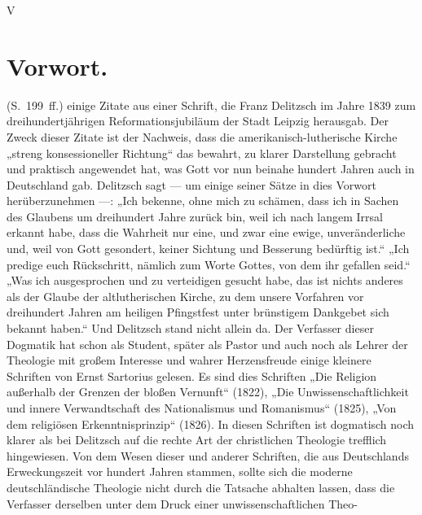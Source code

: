 \noindent\hfill V
\section*{Vorwort.}

(S.~199~ff.) einige Zitate aus einer Schrift, die Franz Delitzsch im Jahre 1839 zum dreihundertjährigen Reformationsjubiläum der Stadt Leipzig herausgab. Der Zweck dieser Zitate ist der Nachweis, dass die amerikanisch-lutherische Kirche „streng konsessioneller Richtung“ das bewahrt, zu klarer Darstellung gebracht und praktisch angewendet hat, was Gott vor nun beinahe hundert Jahren auch in Deutschland gab. Delitzsch sagt --- um einige seiner Sätze in dies Vorwort herüberzunehmen ---: „Ich bekenne, ohne mich zu schämen, dass ich in Sachen des Glaubens um dreihundert Jahre zurück bin, weil ich nach langem Irrsal erkannt habe, dass die Wahrheit nur eine, und zwar eine ewige, unveränderliche und, weil von Gott gesondert, keiner Sichtung und Besserung bedürftig ist.“ „Ich predige euch Rückschritt, nämlich zum Worte Gottes, von dem ihr gefallen seid.“ „Was ich ausgesprochen und zu verteidigen gesucht habe, das ist nichts anderes als der Glaube der altlutherischen Kirche, zu dem unsere Vorfahren vor dreihundert Jahren am heiligen Pfingstfest unter brünstigem Dankgebet sich bekannt haben.“ Und Delitzsch stand nicht allein da. Der Verfasser dieser Dogmatik hat schon als Student, später als Pastor und auch noch als Lehrer der Theologie mit großem Interesse und wahrer Herzensfreude einige kleinere Schriften von Ernst Sartorius gelesen. Es sind dies Schriften „Die Religion außerhalb der Grenzen der bloßen Vernunft“ (1822), „Die Unwissenschaftlichkeit und innere Verwandtschaft des Nationalismus und Romanismus“ (1825), „Von dem religiösen Erkenntnisprinzip“ (1826). In diesen Schriften ist dogmatisch noch klarer als bei Delitzsch auf die rechte Art der christlichen Theologie trefflich hingewiesen. Von dem Wesen dieser und anderer Schriften, die aus Deutschlands Erweckungszeit vor hundert Jahren stammen, sollte sich die moderne deutschländische Theologie nicht durch die Tatsache abhalten lassen, dass die Verfasser derselben unter dem Druck einer unwissenschaftlichen Theo-